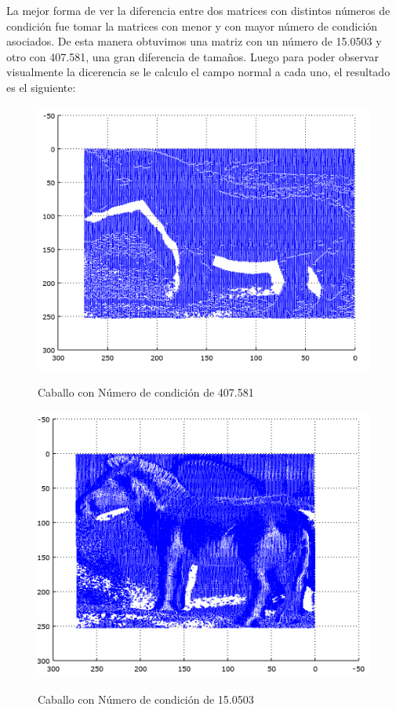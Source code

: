 La mejor forma de ver la diferencia entre dos matrices con distintos números de condición fue tomar la matrices con menor y con mayor número de condición asociados. De esta manera obtuvimos una matriz con un número de 15.0503 y otro con 407.581, una gran diferencia de tamaños. Luego para poder observar visualmente la dicerencia se le calculo el campo normal a cada uno, el resultado es el siguiente:



\begin{figure}[h]
   \includegraphics[scale=0.5]{caballoMax.png}
   \label{Fig. 4}
   \caption{Caballo con Número de condición de 407.581}
\end{figure}

\begin{figure}[h]
   \includegraphics[scale=0.5]{caballoMin.png}
   \label{Fig. 5}
   \caption{Caballo con Número de condición de 15.0503}
\end{figure}


